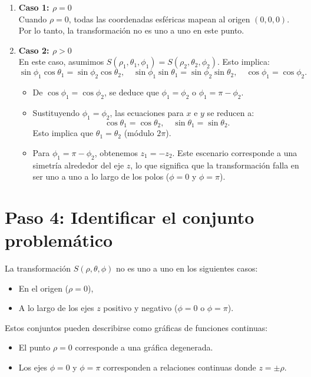 \begin{enumerate}
    \item \textbf{Caso 1: \( \rho = 0 \)}\\
    Cuando \( \rho = 0 \), todas las coordenadas esféricas mapean al origen \( (0, 0, 0) \). Por lo tanto, la transformación no es uno a uno en este punto.

    \item \textbf{Caso 2: \( \rho > 0 \)}\\
    En este caso, asumimos \( S(\rho_1, \theta_1, \phi_1) = S(\rho_2, \theta_2, \phi_2) \). Esto implica:
    \[
    \sin \phi_1 \cos \theta_1 = \sin \phi_2 \cos \theta_2, \quad
    \sin \phi_1 \sin \theta_1 = \sin \phi_2 \sin \theta_2, \quad
    \cos \phi_1 = \cos \phi_2.
    \]
    \begin{itemize}
        \item De \( \cos \phi_1 = \cos \phi_2 \), se deduce que \( \phi_1 = \phi_2 \) o \( \phi_1 = \pi - \phi_2 \).
        \item Sustituyendo \( \phi_1 = \phi_2 \), las ecuaciones para \( x \) e \( y \) se reducen a:
        \[
        \cos \theta_1 = \cos \theta_2, \quad \sin \theta_1 = \sin \theta_2.
        \]
        Esto implica que \( \theta_1 = \theta_2 \) (módulo \( 2\pi \)).
        \item Para \( \phi_1 = \pi - \phi_2 \), obtenemos \( z_1 = -z_2 \). Este escenario corresponde a una simetría alrededor del eje \( z \), lo que significa que la transformación falla en ser uno a uno a lo largo de los polos (\( \phi = 0 \) y \( \phi = \pi \)).
    \end{itemize}
\end{enumerate}

\section*{Paso 4: Identificar el conjunto problemático}

La transformación \( S(\rho, \theta, \phi) \) no es uno a uno en los siguientes casos:
\begin{itemize}
    \item En el origen (\( \rho = 0 \)),
    \item A lo largo de los ejes \( z \) positivo y negativo (\( \phi = 0 \) o \( \phi = \pi \)).
\end{itemize}

Estos conjuntos pueden describirse como gráficas de funciones continuas:
\begin{itemize}
    \item El punto \( \rho = 0 \) corresponde a una gráfica degenerada.
    \item Los ejes \( \phi = 0 \) y \( \phi = \pi \) corresponden a relaciones continuas donde \( z = \pm \rho \).
\end{itemize}

